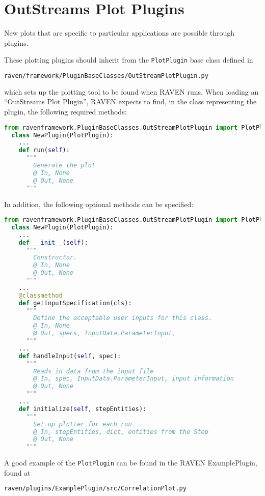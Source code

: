 \section{OutStreams Plot Plugins}
\label{sec:outstreams_plot}
New plots that are specific to particular applications are possible through 
 plugins.

These plotting plugins should inherit from the \texttt{PlotPlugin} base class defined in
\begin{lstlisting}[language=bash]
  raven/framework/PluginBaseClasses/OutStreamPlotPlugin.py
\end{lstlisting}
which sets up the plotting tool to be found when RAVEN runs.
When loading an ``OutStreams Plot Plugin'', RAVEN expects to find, in the class
representing the plugin, the following required methods:
\begin{lstlisting}[language=python, basicstyle=\scriptsize\ttfamily, breaklines=True, columns=fullflexible]
  from ravenframework.PluginBaseClasses.OutStreamPlotPlugin import PlotPlugin
  class NewPlugin(PlotPlugin):
    ...
    def run(self):
      """
        Generate the plot
        @ In, None
        @ Out, None
      """
\end{lstlisting}
In addition, the following optional methods can be specified:
\begin{lstlisting}[language=python, basicstyle=\scriptsize\ttfamily, breaklines=True, columns=fullflexible]
  from ravenframework.PluginBaseClasses.OutStreamPlotPlugin import PlotPlugin
  class NewPlugin(PlotPlugin):
    ...
    def __init__(self):
      """
        Constructor.
        @ In, None
        @ Out, None
      """
    ...
    @classmethod
    def getInputSpecification(cls):
      """
        Define the acceptable user inputs for this class.
        @ In, None
        @ Out, specs, InputData.ParameterInput,
      """
    ...
    def handleInput(self, spec):
      """
        Reads in data from the input file
        @ In, spec, InputData.ParameterInput, input information
        @ Out, None
      """
    ...
    def initialize(self, stepEntities):
      """
        Set up plotter for each run
        @ In, stepEntities, dict, entities from the Step
        @ Out, None
      """
\end{lstlisting}

A good example of the \texttt{PlotPlugin} can be found in the RAVEN ExamplePlugin, found at
\begin{lstlisting}[language=bash]
  raven/plugins/ExamplePlugin/src/CorrelationPlot.py
\end{lstlisting}

